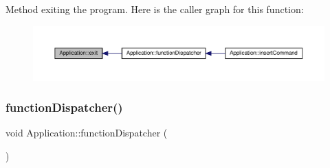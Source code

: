 Method exiting the program. Here is the caller graph for this function\+:\nopagebreak
\begin{figure}[H]
\begin{center}
\leavevmode
\includegraphics[width=350pt]{class_application_a3c8a98d6c10a5b054800488df16cdbcb_icgraph}
\end{center}
\end{figure}
\mbox{\label{class_application_a00241f0a09c32b0ef3cb1f068475cc50}} 
\subsubsection{\texorpdfstring{function\+Dispatcher()}{functionDispatcher()}}
{\footnotesize\ttfamily void Application\+::function\+Dispatcher (\begin{DoxyParamCaption}{ }\end{DoxyParamCaption})\hspace{0.3cm}{\ttfamily [private]}}

